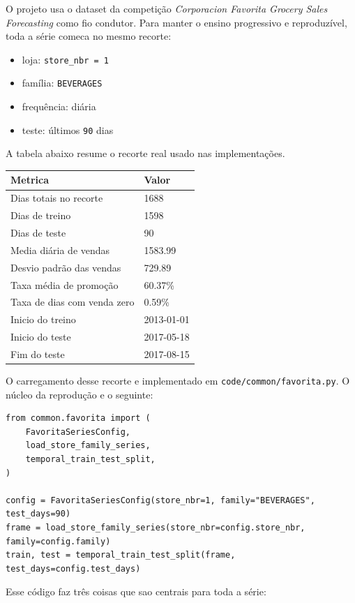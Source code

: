 \documentclass[12pt]{article}
\providecommand{\tightlist}{%
          \setlength{\itemsep}{0pt}\setlength{\parskip}{0pt}}
\begin{document}
O projeto usa o dataset da competição \emph{Corporacion Favorita Grocery Sales Forecasting} como fio condutor. Para manter o ensino progressivo e reproduzível, toda a série comeca no mesmo recorte:

\begin{itemize}
\tightlist
\item
  loja: \texttt{store\_nbr\ =\ 1}
\item
  família: \texttt{BEVERAGES}
\item
  frequência: diária
\item
  teste: últimos \texttt{90} dias
\end{itemize}

A tabela abaixo resume o recorte real usado nas implementações.

\begin{longtable}[]{@{}ll@{}}
\toprule\noalign{}
Metrica & Valor \\
\midrule\noalign{}
\endhead
\bottomrule\noalign{}
\endlastfoot
Dias totais no recorte & 1688 \\
Dias de treino & 1598 \\
Dias de teste & 90 \\
Media diária de vendas & 1583.99 \\
Desvio padrão das vendas & 729.89 \\
Taxa média de promoção & 60.37\% \\
Taxa de dias com venda zero & 0.59\% \\
Inicio do treino & 2013-01-01 \\
Inicio do teste & 2017-05-18 \\
Fim do teste & 2017-08-15 \\
\end{longtable}

O carregamento desse recorte e implementado em \texttt{code/common/favorita.py}. O núcleo da reprodução e o seguinte:

\begin{verbatim}
from common.favorita import (
    FavoritaSeriesConfig,
    load_store_family_series,
    temporal_train_test_split,
)

config = FavoritaSeriesConfig(store_nbr=1, family="BEVERAGES", test_days=90)
frame = load_store_family_series(store_nbr=config.store_nbr, family=config.family)
train, test = temporal_train_test_split(frame, test_days=config.test_days)
\end{verbatim}

Esse código faz três coisas que sao centrais para toda a série:
\end{document}
